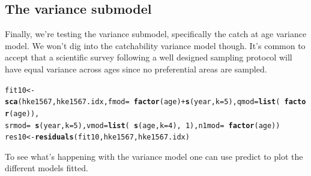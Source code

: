 \documentclass[a4paper,english,11pt]{article}\usepackage[]{graphicx}\usepackage[]{xcolor}
\makeatletter
\newcommand{\hlnum}[1]{\textcolor[rgb]{0.686,0.059,0.569}{#1}}%
\newcommand{\hlopt}[1]{\textcolor[rgb]{0,0,0}{#1}}%
\newcommand{\hldef}[1]{\textcolor[rgb]{0.345,0.345,0.345}{#1}}%
\newcommand{\hlkwb}[1]{\textcolor[rgb]{0.69,0.353,0.396}{#1}}%
\newcommand{\hlkwc}[1]{\textcolor[rgb]{0.333,0.667,0.333}{#1}}%
\newcommand{\hlkwd}[1]{\textcolor[rgb]{0.737,0.353,0.396}{\textbf{#1}}}%
\newenvironment{kframe}{%
 \def\at@end@of@kframe{}%
 \ifinner\ifhmode%
  \def\at@end@of@kframe{\end{minipage}}%
  \begin{minipage}{\columnwidth}%
 \fi\fi%
 \def\FrameCommand##1{\hskip\@totalleftmargin \hskip-\fboxsep
 \colorbox{shadecolor}{##1}\hskip-\fboxsep
     \hskip-\linewidth \hskip-\@totalleftmargin \hskip\columnwidth}%
 \MakeFramed {\advance\hsize-\width
   \@totalleftmargin\z@ \linewidth\hsize
   \@setminipage}}%
 {\par\unskip\endMakeFramed%
 \at@end@of@kframe}
\newenvironment{knitrout}{}{} %
\makeatother
\begin{document}
\subsection{The variance submodel}

Finally, we're testing the variance submodel, specifically the catch at age variance model. We won't dig into the catchability variance model though. It's common to accept that a scientific survey following a well designed sampling protocol will have equal variance across ages since no preferential areas are sampled. 

\begin{knitrout}
\color{fgcolor}\begin{kframe}
\begin{alltt}
\hldef{fit10} \hlkwb{<-} \hlkwd{sca}\hldef{(hke1567, hke1567.idx,} \hlkwc{fmod} \hldef{=} \hlopt{~}\hlkwd{factor}\hldef{(age)} \hlopt{+} \hlkwd{s}\hldef{(year,} \hlkwc{k} \hldef{=} \hlnum{5}\hldef{),} \hlkwc{qmod} \hldef{=} \hlkwd{list}\hldef{(}\hlopt{~}\hlkwd{factor}\hldef{(age)),}
    \hlkwc{srmod} \hldef{=} \hlopt{~}\hlkwd{s}\hldef{(year,} \hlkwc{k} \hldef{=} \hlnum{5}\hldef{),} \hlkwc{vmod} \hldef{=} \hlkwd{list}\hldef{(}\hlopt{~}\hlkwd{s}\hldef{(age,} \hlkwc{k} \hldef{=} \hlnum{4}\hldef{),} \hlopt{~}\hlnum{1}\hldef{),} \hlkwc{n1mod} \hldef{=} \hlopt{~}\hlkwd{factor}\hldef{(age))}
\hldef{res10} \hlkwb{<-} \hlkwd{residuals}\hldef{(fit10, hke1567, hke1567.idx)}
\end{alltt}
\end{kframe}
\end{knitrout}

To see what's happening with the variance model one can use predict to plot the different models fitted.
\end{document}
